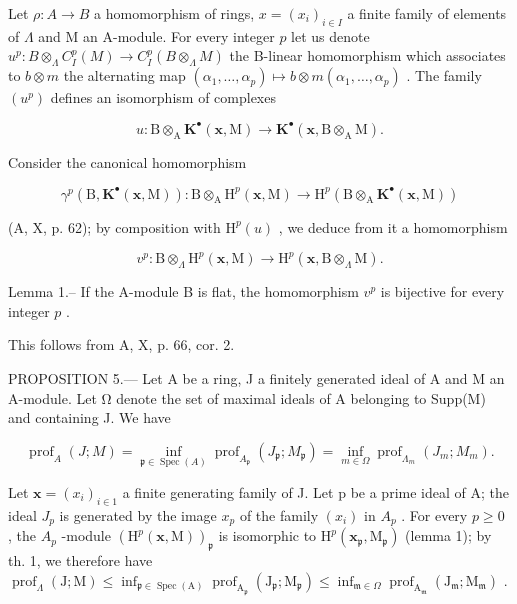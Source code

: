 Let \(\rho: A \to B\) a homomorphism of rings, \(x = (x_i)_{i \in I}\) a finite family of elements of \(\Lambda\) and M an A-module. For every integer \(p\) let us denote \(u^p: B \otimes_\Lambda C_I^p(M) \longrightarrow C_I^p(B \otimes_\Lambda M)\) the B-linear homomorphism which associates to \(b \otimes m\) the alternating map \((\alpha_1, \ldots, \alpha_p) \mapsto b \otimes m(\alpha_1, \ldots, \alpha_p)\) . The family \((u^p)\) defines an isomorphism of complexes

\[
u: \mathrm{B} \otimes_ {\mathrm{A}} \mathbf {K} ^ {\bullet} (\mathbf {x}, \mathrm{M}) \longrightarrow \mathbf {K} ^ {\bullet} (\mathbf {x}, \mathrm{B} \otimes_ {\mathrm{A}} \mathrm{M}).
\]

Consider the canonical homomorphism

\[
\gamma^ {p} (\mathrm{B}, \mathbf {K} ^ {\bullet} (\mathbf {x}, \mathrm{M})): \mathrm{B} \otimes_ {\mathrm{A}} \mathrm{H} ^ {p} (\mathbf {x}, \mathrm{M}) \longrightarrow \mathrm{H} ^ {p} (\mathrm{B} \otimes_ {\mathrm{A}} \mathbf {K} ^ {\bullet} (\mathbf {x}, \mathrm{M}))
\]

(A, X, p. 62); by composition with \(\mathrm{H}^{p}(u)\) , we deduce from it a homomorphism

\[
v ^ {p}: \mathrm{B} \otimes_ {\Lambda} \mathrm{H} ^ {p} (\mathbf {x}, \mathrm{M}) \longrightarrow \mathrm{H} ^ {p} (\mathbf {x}, \mathrm{B} \otimes_ {\Lambda} \mathrm{M}).
\]

Lemma 1.-- If the A-module B is flat, the homomorphism \(v^p\) is bijective for every integer \(p\) .

This follows from A, X, p. 66, cor. 2.

PROPOSITION 5.--- Let A be a ring, J a finitely generated ideal of A and M an A-module. Let Ω denote the set of maximal ideals of A belonging to Supp(M) and containing J. We have

\[
\operatorname{prof} _ {A} (J; M) = \inf _ {\mathfrak {p} \in \operatorname{Spec} (A)} \operatorname{prof} _ {A _ {\mathfrak {p}}} \left(J _ {\mathfrak {p}}; M _ {\mathfrak {p}}\right) = \inf _ {m \in \Omega} \operatorname{prof} _ {\Lambda_ {m}} \left(J _ {m}; M _ {m}\right).
\]

Let \(\mathbf{x} = (x_{i})_{i \in 1}\) a finite generating family of J. Let p be a prime ideal of A; the ideal \(J_{p}\) is generated by the image \(x_{p}\) of the family \((x_{i})\) in \(A_{p}\) . For every \(p \geqslant 0\) , the \(A_{p}\) -module \(\left(\mathrm{H}^{p}(\mathbf{x},\mathrm{M})\right)_{\mathfrak{p}}\) is isomorphic to \(\mathrm{H}^{p}(\mathbf{x}_{\mathfrak{p}},\mathrm{M}_{\mathfrak{p}})\) (lemma 1); by th. 1, we therefore have \(\operatorname{prof}_{\Lambda}(\mathrm{J};\mathrm{M}) \leqslant \inf_{\mathfrak{p} \in \operatorname{Spec}(\mathrm{A})} \operatorname{prof}_{\mathrm{A}_{\mathfrak{p}}}(\mathrm{J}_{\mathfrak{p}}; \mathrm{M}_{\mathfrak{p}}) \leqslant \inf_{\mathfrak{m} \in \Omega} \operatorname{prof}_{\mathrm{A}_{\mathfrak{m}}}(\mathrm{J}_{\mathfrak{m}}; \mathrm{M}_{\mathfrak{m}})\) .

